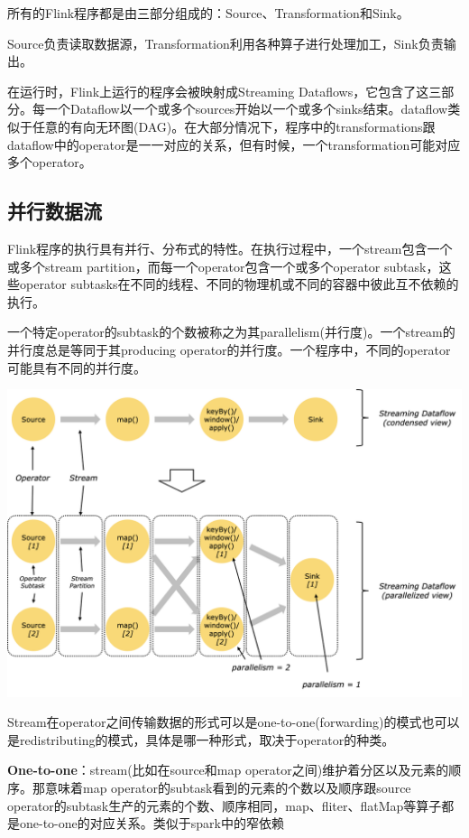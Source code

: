 \documentclass{ctexart}
\begin{document}
所有的Flink程序都是由三部分组成的：Source、Transformation和Sink。

Source负责读取数据源，Transformation利用各种算子进行处理加工，Sink负责输出。

在运行时，Flink上运行的程序会被映射成Streaming Dataflows，它包含了这三部分。每一个Dataflow以一个或多个sources开始以一个或多个sinks结束。dataflow类似于任意的有向无环图(DAG)。在大部分情况下，程序中的transformations跟dataflow中的operator是一一对应的关系，但有时候，一个transformation可能对应多个operator。

\subsection{并行数据流}

Flink程序的执行具有并行、分布式的特性。在执行过程中，一个stream包含一个或多个stream partition，而每一个operator包含一个或多个operator subtask，这些operator subtasks在不同的线程、不同的物理机或不同的容器中彼此互不依赖的执行。

一个特定operator的subtask的个数被称之为其parallelism(并行度)。一个stream的并行度总是等同于其producing operator的并行度。一个程序中，不同的operator可能具有不同的并行度。

\includegraphics[width=\textwidth]{parallel_dataflow.png}

Stream在operator之间传输数据的形式可以是one-to-one(forwarding)的模式也可以是redistributing的模式，具体是哪一种形式，取决于operator的种类。

\textbf{One-to-one}：stream(比如在source和map operator之间)维护着分区以及元素的顺序。那意味着map operator的subtask看到的元素的个数以及顺序跟source operator的subtask生产的元素的个数、顺序相同，map、fliter、flatMap等算子都是one-to-one的对应关系。类似于spark中的窄依赖
\end{document}
